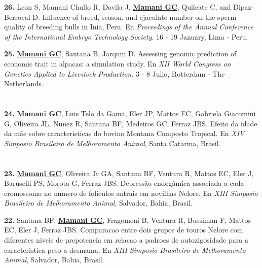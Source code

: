 \documentclass[margin,line,10pt]{res}
\newenvironment{list1}{
  \begin{list}{\ding{113}}{%
      \setlength{\itemsep}{0in}
      \setlength{\parsep}{0in} \setlength{\parskip}{0in}
      \setlength{\topsep}{0in} \setlength{\partopsep}{0in} 
      \setlength{\leftmargin}{0.17in}}}{\end{list}}
\begin{document}
\begin{resume}
\begin{list1}
\item [\bf{26}.] Leon  S, Mamani Chullo R, Davila J, {\bf \underline{Mamani GC}}, Quilcate C,  and Dipaz-Berrocal D.
Influence of breed, season, and ejaculate number on the sperm quality of breeding bulls in Inia, Peru. En {\it
Proceedings of the Annual Conference of the International Embryo Technology Society}. 16 - 19 January, Lima - Peru. 
\vspace{0.2cm}
\item [\bf{25}.] {\bf \underline{Mamani GC}}, Santana B, Jarquin D. 
Assessing genomic prediction of economic trait in alpacas: a simulation study. En {\it
XII World Congress on Genetics Applied to Livestock Production}. 3 - 8 Julio, Rotterdam - The Netherlands. 
\vspace{0.5cm}

\end{list1}

\section{}

\begin{list1}

\item [\bf{24}.] {\bf \underline{Mamani GC}}, Luis Telo da Gama, Eler JP,  Mattos EC, Gabriela Giacomini G, Oliveira JL, Nunez R, Santana BF, Medeiros GC, Ferraz JBS. Efeito da idade da mãe sobre caracteristicas do bovino Montana Composto Tropical. En {\it XIV Simposio Brasileiro de Melhoramento Animal}, Santa Catarina, Brasil. 
\end{list1}

\section{}

\begin{list1}

\item [\bf{23}.] {\bf \underline{Mamani GC}}, Oliveira Jr GA, Santana BF,  Ventura R, Mattos EC, Eler J, Baruselli PS, Morota G, Ferraz JBS. Depressão endogâmica associada a cada cromossomo no numero de foliculos antrais em novilhas Nelore. En {\it XIII Simposio Brasileiro de Melhoramento Animal}, Salvador, Bahia, Brasil. 
\vspace{0.5cm}

\item [\bf{22}.] Santana BF, {\bf \underline{Mamani GC}}, Fragomeni B, Ventura R, Bussiman F, Mattos EC, Eler J, Ferraz JBS. Comparacao entre dois grupos de touros Nelore com diferentes niveis de prepotencia em relacao a padroes de autozigosidade para a caracteristica peso a desmama. En {\it XIII Simposio Brasileiro de Melhoramento Animal}, Salvador, Bahia, Brasil. 
\vspace{0.5cm}


\end{list1}
\end{resume}
\end{document}
